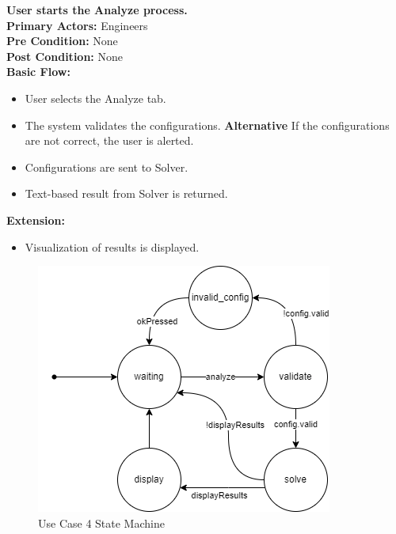 \documentclass[12pt]{article}
\begin{document}
\noindent
\textbf{User starts the Analyze process. } \\
\textbf{  Primary Actors:} Engineers\\
\textbf{  Pre Condition:} None\\
\textbf{  Post Condition:} None\\ 
\textbf{  Basic Flow:} 
\begin{itemize}
\item User selects the Analyze tab. 
\item The system validates the configurations.
\subitem \textbf{Alternative} If the configurations are not correct, the user is alerted.
\item Configurations are sent to Solver. 
\item Text-based result from Solver is returned.
\end{itemize}
\textbf{  Extension:} 
\begin{itemize}
\item Visualization of results is displayed.
\end{itemize}
\begin{figure}[H]
  \centering
  \includegraphics[width=0.5\linewidth]{use-case-4-sm.png}
  \caption{Use Case 4 State Machine}
  \label {fig:use-case-4-sm}
\end{figure}
\end{document}
